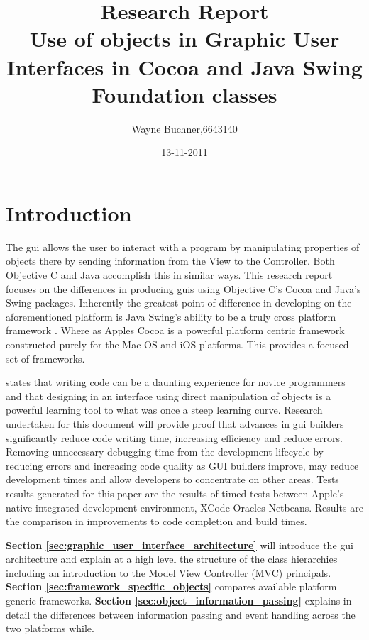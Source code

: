 \documentclass[a4paper,14pt]{article}
\title{Research Report\\Use of objects in Graphic User Interfaces in Cocoa and Java Swing Foundation classes}
\author{Wayne Buchner,6643140}
\date{13-11-2011}
\begin{document}
\ifpdf
{}
\else
{}
\fi

\maketitle
\thispagestyle{empty}
\newpage

\section{Introduction} %
\label{sec:introduction}
The \gls{gui} allows the user to interact with a program by manipulating properties of objects there by sending information from the View to the Controller. Both Objective C and Java accomplish this in similar ways. This research report focuses on the differences in producing \gls{gui}s using Objective C's Cocoa and Java's Swing packages. Inherently the greatest point of difference in developing on the aforementioned platform is Java Swing's ability to be a truly cross platform framework \cite{nla.cat-vn3060178}. Where as Apples Cocoa is a powerful platform centric framework constructed purely for the Mac OS and iOS platforms. This provides a focused set of frameworks. 

%
 states that writing code can be a daunting experience for novice programmers and that designing in an interface using direct manipulation of objects is a powerful learning tool to what was once a steep learning curve. Research undertaken for this document will provide proof that advances in \gls{gui} builders significantly reduce code writing time, increasing efficiency and reduce errors. Removing unnecessary debugging time from the development lifecycle by reducing errors and increasing code quality as GUI builders improve, may reduce development times and allow developers to concentrate on other areas. Tests results generated for this paper are the results of timed tests between Apple's native integrated development environment, XCode Oracles Netbeans. Results are the comparison in improvements to code completion and build times.  
%

\textbf{Section \ref{sec:graphic_user_interface_architecture}} will introduce the \gls{gui} architecture and explain at a high level the structure of the class hierarchies including an introduction to the Model View Controller (MVC) principals. \textbf{Section \ref{sec:framework_specific_objects}} compares available platform generic frameworks. \textbf{Section \ref{sec:object_information_passing}} explains in detail the differences between information passing and event handling across the two platforms while.
\end{document}
